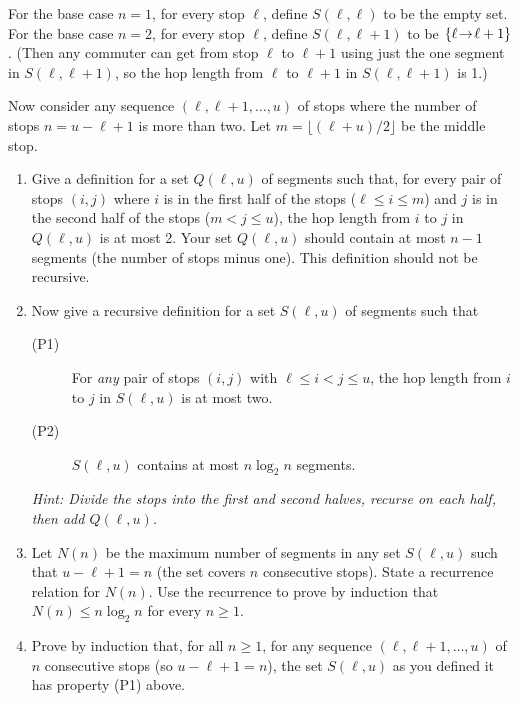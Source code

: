 \documentclass[11pt]{article}
\begin{document}
For the base case $n=1$, for every stop $\ell$,
define $S(\ell, \ell)$ to be the empty set.
For the base case $n=2$, for every stop $\ell$,
define $S(\ell, \ell+1)$ to be $\{ \ell\!\to\! \ell+1 \}$.
(Then any commuter can get from stop $\ell$ to $\ell+1$ using just the one segment in $S(\ell, \ell+1)$,
so the hop length from $\ell$ to $\ell+1$ in  $S(\ell, \ell+1)$ is 1.)

Now consider any sequence $(\ell, \ell+1, \ldots, u)$ of stops where the number of stops $n=u-\ell+1$ is more than two.
Let $m=\lfloor (\ell+u)/2\rfloor$ be the middle stop.
\begin{enumerate}[label=(\alph*)]
\item 
  Give a definition for a set $Q(\ell, u)$ of segments such that,
  for every pair of stops $(i, j)$ where $i$ is in the first half of the stops ($\ell\le i \le m$)
  and $j$ is in the second half of the stops ($m <j\le u$),
  the hop length from $i$ to $j$ in $Q(\ell, u)$ is at most 2.
  Your set $Q(\ell,  u)$ should contain at most $n-1$ segments (the number of stops minus one).
  This definition should not be recursive.

\item Now give a recursive definition for a set $S(\ell, u)$ of segments such that
  \begin{description}
  \item[(P1)] For \emph{any} pair of stops $(i, j)$ with $\ell\le i < j \le u$,
    the hop length from $i$ to $j$ in $S(\ell, u)$ is at most two.
  \item[(P2)] $S(\ell, u)$ contains at most $n\log_2 n$ segments. 
  \end{description}
  \emph{Hint: Divide the stops into the first and second halves,
    recurse on each half, then add $Q(\ell, u)$.}

\item Let $N(n)$ be the maximum number of segments in any set $S(\ell, u)$ such that $u-\ell+1=n$
  (the set covers $n$ consecutive stops).  State a recurrence relation for $N(n)$.
  Use the recurrence to prove by induction that $N(n) \le n\log_2 n$ for every $n\ge 1$.

\item Prove by induction that, for all $n\ge 1$,
  for any sequence $(\ell,\ell+1, \ldots, u)$ of $n$ consecutive stops (so $u-\ell+1=n$),
  the set $S(\ell, u)$ as you defined it has property (P1) above.
\end{enumerate}

\continued

\setlength{\ITEMHT}{3in}
{
  \injectEnumerate 

}


\end{document}
